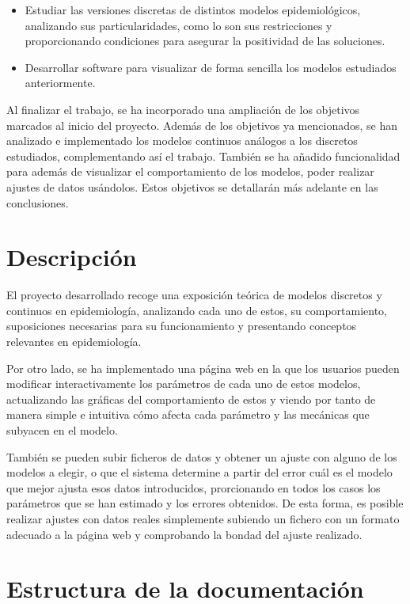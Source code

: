 \begin{itemize}
\item Estudiar las versiones discretas de distintos modelos epidemiológicos, analizando sus particularidades, como lo son sus restricciones y proporcionando condiciones para asegurar la positividad de las soluciones.
\item Desarrollar software para visualizar de forma sencilla los modelos estudiados anteriormente.
\end{itemize}

Al finalizar el trabajo, se ha incorporado una ampliación de los objetivos marcados al inicio del proyecto. Además de los objetivos ya mencionados, se han analizado e implementado los modelos continuos análogos a los discretos estudiados, complementando así el trabajo. También se ha añadido funcionalidad para además de visualizar el comportamiento de los modelos, poder realizar ajustes de datos usándolos. Estos objetivos se detallarán más adelante en las conclusiones.


\section{Descripción}

El proyecto desarrollado recoge una exposición teórica de modelos discretos y continuos en epidemiología, analizando cada uno de estos, su comportamiento, suposiciones necesarias para su funcionamiento y presentando conceptos relevantes en epidemiología.

Por otro lado, se ha implementado una página web en la que los usuarios pueden modificar interactivamente los parámetros de cada uno de estos modelos, actualizando las gráficas del comportamiento de estos y viendo por tanto de manera simple e intuitiva cómo afecta cada parámetro y las mecánicas que subyacen en el modelo.

También se pueden subir ficheros de datos y obtener un ajuste con alguno de los modelos a elegir, o que el sistema determine a partir del error cuál es el modelo que mejor ajusta esos datos introducidos, prorcionando en todos los casos los parámetros que se han estimado y los errores obtenidos. De esta forma, es posible realizar ajustes con datos reales simplemente subiendo un fichero con un formato adecuado a la página web y comprobando la bondad del ajuste realizado.


\section{Estructura de la documentación}

